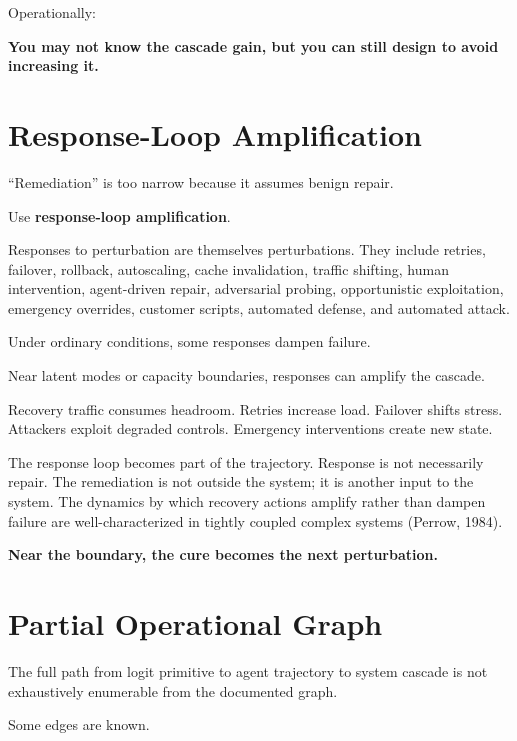 \documentclass[11pt]{article}
\begin{document}
Operationally:

\begin{pullquote}
\textbf{You may not know the cascade gain, but you can still design to avoid increasing it.}
\end{pullquote}

\section{Response-Loop Amplification}

``Remediation'' is too narrow because it assumes benign repair.

Use \textbf{response-loop amplification}.

Responses to perturbation are themselves perturbations. They include retries, failover, rollback, autoscaling, cache invalidation, traffic shifting, human intervention, agent-driven repair, adversarial probing, opportunistic exploitation, emergency overrides, customer scripts, automated defense, and automated attack.

Under ordinary conditions, some responses dampen failure.

Near latent modes or capacity boundaries, responses can amplify the cascade.

Recovery traffic consumes headroom. Retries increase load. Failover shifts stress. Attackers exploit degraded controls. Emergency interventions create new state.

The response loop becomes part of the trajectory. Response is not necessarily repair. The remediation is not outside the system; it is another input to the system. The dynamics by which recovery actions amplify rather than dampen failure are well-characterized in tightly coupled complex systems (Perrow, 1984).

\begin{pullquote}
\textbf{Near the boundary, the cure becomes the next perturbation.}
\end{pullquote}

\section{Partial Operational Graph}

The full path from logit primitive to agent trajectory to system cascade is not exhaustively enumerable from the documented graph.

Some edges are known.
\end{document}
